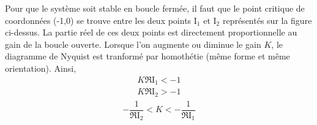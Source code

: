 \begin{center}
\end{center}

Pour que le système soit stable en boucle fermée, il faut que le point 
critique de coordonnées (-1,0) se trouve entre les deux points I$_1$ et 
I$_2$ représentés sur la figure ci-dessus.
La partie réel de ces deux points est directement proportionnelle au 
gain de la boucle ouverte. Lorsque l'on augmente ou diminue le gain $K$, 
le diagramme de Nyquist est tranformé par homothétie (même forme et 
même orientation).
Ainsi, 
\begin{align*}
    K\Re{\mathrm{I}_1} < -1 \\
    K\Re{\mathrm{I}_2} > -1 
\end{align*}
\begin{align*}
    -\dfrac{1}{\Re{\mathrm{I}_2}}<K<-\dfrac{1}{\Re{\mathrm{I}_1}}
\end{align*}

